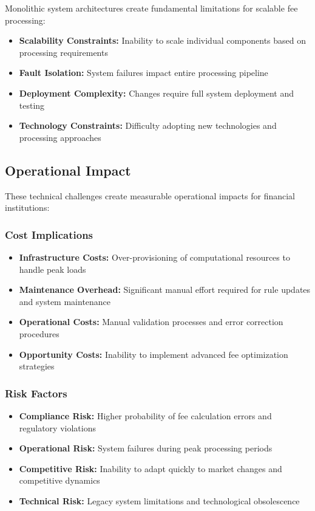 Monolithic system architectures create fundamental limitations for scalable fee processing:

\begin{itemize}
   \item \textbf{Scalability Constraints:} Inability to scale individual components based on processing requirements
   \item \textbf{Fault Isolation:} System failures impact entire processing pipeline
   \item \textbf{Deployment Complexity:} Changes require full system deployment and testing
   \item \textbf{Technology Constraints:} Difficulty adopting new technologies and processing approaches
\end{itemize}

\subsection{Operational Impact}

These technical challenges create measurable operational impacts for financial institutions:

\subsubsection{Cost Implications}

\begin{itemize}
   \item \textbf{Infrastructure Costs:} Over-provisioning of computational resources to handle peak loads
   \item \textbf{Maintenance Overhead:} Significant manual effort required for rule updates and system maintenance
   \item \textbf{Operational Costs:} Manual validation processes and error correction procedures
   \item \textbf{Opportunity Costs:} Inability to implement advanced fee optimization strategies
\end{itemize}

\subsubsection{Risk Factors}

\begin{itemize}
   \item \textbf{Compliance Risk:} Higher probability of fee calculation errors and regulatory violations
   \item \textbf{Operational Risk:} System failures during peak processing periods
   \item \textbf{Competitive Risk:} Inability to adapt quickly to market changes and competitive dynamics
   \item \textbf{Technical Risk:} Legacy system limitations and technological obsolescence
\end{itemize}

